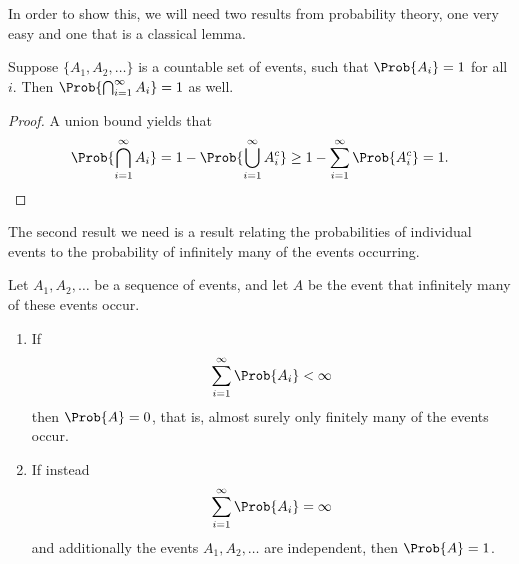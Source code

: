 \documentclass[nobib]{tufte-handout}
\begin{document}
In order to show this, we will need two results from probability theory, one very easy and one that is a classical lemma.

\begin{remark}\label{remark:countable_as_intersection_as}
    Suppose $\{A_1, A_2, \ldots\}$ is a countable set of events, such that $\Prob{A_i} = 1$ for all $i$. Then $\Prob{\bigcap_{i=1}^\infty A_i} = 1$ as well.

    \begin{proof}
        A union bound yields that
        $$\Prob{\bigcap_{i=1}^\infty A_i} = 1 - \Prob{\bigcup_{i=1}^\infty A_i^c} \geq 1 - \sum_{i=1}^\infty \Prob{A_i^c} = 1.$$
    \end{proof}
\end{remark}

The second result we need is a result relating the probabilities of individual events to the probability of infinitely many of the events occurring.

\begin{lemma}
    Let $A_1, A_2, \ldots$ be a sequence of events, and let $A$ be the event that infinitely many of these events occur.

    \begin{enumerate}
        \item If
        $$\sum_{i=1}^\infty \Prob{A_i} < \infty$$
        then $\Prob{A} = 0$, that is, almost surely only finitely many of the events occur.
        \item If instead
        $$\sum_{i=1}^\infty \Prob{A_i} = \infty$$
        and additionally the events $A_1, A_2,\ldots$ are independent, then $\Prob{A} = 1$.
    \end{enumerate}
\end{lemma}
\end{document}
